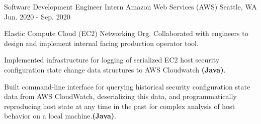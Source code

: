 \cventry
    {Software Development Engineer Intern} %
    {Amazon Web Services (AWS)} %
    {Seattle, WA} %
    {Jun. 2020 - Sep. 2020} %
    {
      \begin{cvitems} %
        \item {Elastic Compute Cloud (EC2) Networking Org. Collaborated with 
        engineers to design and implement internal facing production operator tool.}
        \item {Implemented infrastructure for logging of serialized
        EC2 host security configuration state change data structures to 
        AWS Cloudwatch \textbf{(Java)}.}
        \item {Built command-line interface for querying historical 
        security configuration state data from AWS CloudWatch, 
        deserializing this data, and 
        programmatically reproducing host state at any time in 
        the past for complex analysis 
        of host behavior on a local machine.\textbf{(Java)}.}
      \end{cvitems}
    } 